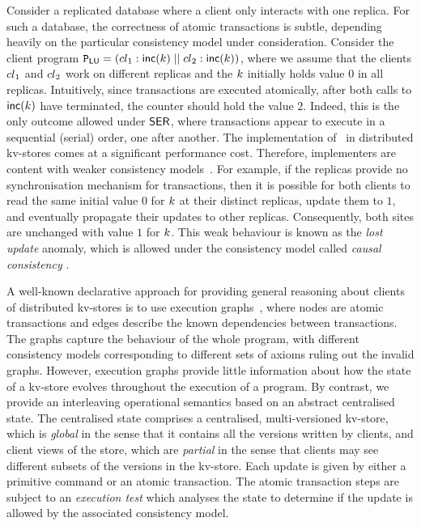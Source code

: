 Consider a replicated database where
a client only interacts with one replica.
For such a database, the 
correctness of atomic transactions is subtle, depending heavily on the
particular consistency model under consideration.  
Consider the client program
$\mathtt{P}_{\mathsf{LU}} = \left({cl}_1 : \mathsf{inc}(k) \;|| \; {cl}_2:
  \mathsf{inc}(k) \right)$, 
where we assume that the clients \( {cl}_1 \) and \( {cl}_2 \) work on different replicas and
the \(k\) initially holds value \(0\) in all replicas.
Intuitively, since transactions are executed atomically, after both
calls to \(\mathsf{inc}(k)\) have terminated, the counter should hold 
the value \(2\).
Indeed, this is the only outcome allowed under \(\mathsf{SER}\), where transactions
appear to execute in a sequential (serial) order, one after another.
The implementation of  \SER\ in distributed kv-stores comes at a
significant performance cost. Therefore, implementers are content with
{weaker} consistency models~\cite{ramp,rola,cops,wren,redblue,PSI,NMSI,gdur,clocksi,distrsi}. 
For example, if the replicas provide no synchronisation mechanism for transactions,
then it is possible for both clients to read the same initial value \(0\) for \(k\) at their
distinct replicas, update them to \(1\), and eventually propagate their updates to other replicas. 
Consequently, both
sites  are unchanged with value  \(1\) for \(k\).
This weak behaviour is known as the \emph{lost update} anomaly, which
is  allowed under the consistency model called {\em causal consistency} \cite{cops,wren,redblue}.



A well-known declarative approach for providing general reasoning
about clients of distributed kv-stores is to use  execution 
graphs~\cite{adya-icde,adya,framework-concur,ev_transactions},
where nodes are atomic transactions and edges describe the
known dependencies between transactions. The graphs capture the
behaviour of the whole program, with different consistency models
corresponding to different sets of axioms ruling out the invalid graphs. 
However, execution graphs provide little information about how the 
state of a kv-store evolves throughout the execution of a program.
By contrast, we provide an interleaving operational semantics based on an
abstract centralised state. The centralised state comprises a
centralised, multi-versioned kv-store, which is {\em global} in the
sense that it contains all the versions written by clients, and client views of the store,
which are {\em partial} in the sense that clients may see different 
subsets of the versions in the kv-store. Each update is given by either
a primitive command or an atomic transaction. The atomic
transaction steps are subject to an {\em execution test} which
analyses the state to determine if the update is allowed by 
the associated  consistency model. 




